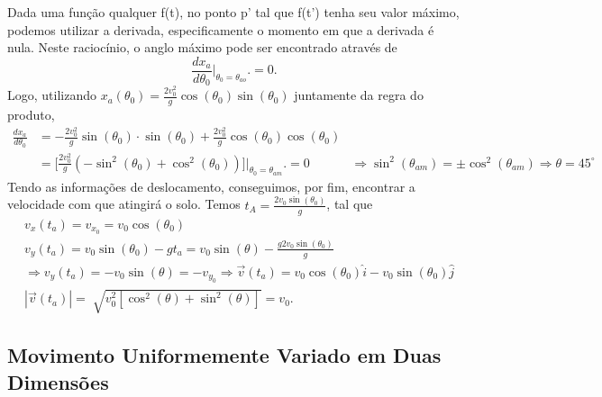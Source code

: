 \documentclass[physics_notes.tex]{subfiles}
\begin{document}
Dada uma função qualquer f(t), no ponto p' tal que f(t') tenha seu valor máximo, podemos utilizar a derivada, especificamente
o momento em que a derivada é nula. Neste raciocínio, o anglo máximo pode ser encontrado através de
$$
	\frac{dx_{a}}{d\theta _{0}} \biggl|_{\theta_{0}=\theta_{ao}}^{}\biggr. = 0.
$$
Logo, utilizando $x_{a}(\theta_{0}) = \frac{2v_{0}^{2}}{g}\cos{(\theta_{0})}\sin{(\theta_{0})}$ juntamente da regra do produto,
\begin{align*}
	\frac{dx_{a}}{d\theta _{0}} & = -\frac{2v_{0}^{2}}{g}\sin{(\theta_{0})}\cdot \sin{(\theta_{0})} + \frac{2v_{0}^{2}}{g}\cos{(\theta_{0})}\cos{(\theta_{0})}       \\
	                            & = \biggl[\frac{2v_{0}^{2}}{g}(-\sin^{2}{(\theta_{0})}+\cos^{2}{(\theta_{0})})\biggr]\biggl|_{\theta_{0}=\theta_{am}}^{}\biggr. = 0
	                            & \Rightarrow \sin^{2}{(\theta_{am})}=\pm\cos^{2}{(\theta_{am})} \Rightarrow \boxed{\theta =45^{\circ}}
\end{align*}
Tendo as informações de deslocamento, conseguimos, por fim, encontrar a velocidade com que atingirá o solo. Temos
$t_{A} = \frac{2v_{0}\sin{(\theta_{0})}}{g}$, tal que
\begin{align*}
	 & v_{x}(t_{a}) = v_{x_{0}} = v_{0}\cos{(\theta_{0})}                                                                                                          \\
	 & v_{y}(t_{a}) = v_{0}\sin{(\theta_{0})}-gt_{a} = v_{0}\sin{(\theta )} - \frac{g2v_{0}\sin{(\theta _0)}}{g}                                                   \\
	 & \Rightarrow  v_{y}(t_{a}) = -v_{0}\sin{(\theta )} = -v_{y_{0}} \Rightarrow \vec{v}(t_{a}) = v_{0}\cos{(\theta_{0})}\hat{i} - v_{0}\sin{(\theta_{0})}\hat{j} \\
	 & |\vec{v}(t_{a})| = \sqrt[]{v_{0}^{2}[\cos^{2}{(\theta )}+\sin^{2}{(\theta )}]} = v_{0}.
\end{align*}

\subsection{Movimento Uniformemente Variado em Duas Dimensões}
\end{document}
